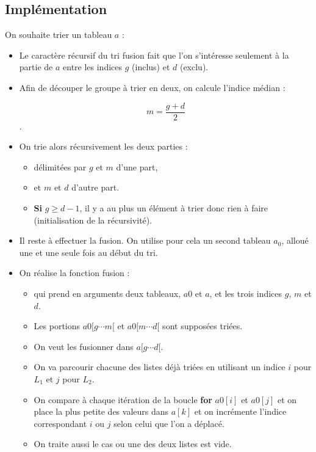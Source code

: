 \subsection{Implémentation}


On souhaite trier un tableau $a$ :
\begin{itemize}
\item Le caractère récursif du tri fusion fait que l'on s'intéresse seulement à la partie de $a$ entre les indices $g$ (inclus) et $d$ (exclu).
\item Afin de découper le groupe à trier en deux, on calcule l'indice médian :

$$m = \frac{g+d}{2}$$ . 

\item On trie alors récursivement les deux parties :
\begin{itemize}
\item délimitées par $g$ et $m$ d'une part,
\item et $m$ et $d$ d'autre part.
\item \textbf{Si} \textbf{$g\geq d-1$}, il y a au plus un élément à trier donc rien à faire (initialisation de la récursivité).
\end{itemize}

\ifprof
\begin{center}
		
\end{center}
\fi


\item Il reste à effectuer la fusion. On utilise pour cela un second tableau $a_0$, alloué une et une seule fois au
début du tri.
\item On réalise la fonction fusion :
\begin{itemize}
\item qui prend en arguments deux tableaux, $a0$ et $a$, et les trois indices $g$, $m$ et $d$. 
\item Les portions $a0[g \cdots  m[$ et $a0[m \cdots d[$ sont supposées triées.
\item On veut les fusionner dans $a[g\cdots d[$. 
\item On va parcourir chacune des listes déjà triées en utilisant un indice $i$ pour $L_1$ et $j$ pour $L_2$.
\item On compare à chaque itération de la boucle \textbf{for} $a0[i]$ et $a0[j]$ et on place la plus petite des valeurs dans $a[k]$ et on incrémente l'indice correspondant $i$ ou $j$ selon celui que l'on a déplacé.
\item On traite aussi le cas ou une des deux listes est vide.
\end{itemize}

\ifprof
\begin{center}
		
\end{center}
\fi

\end{itemize}



